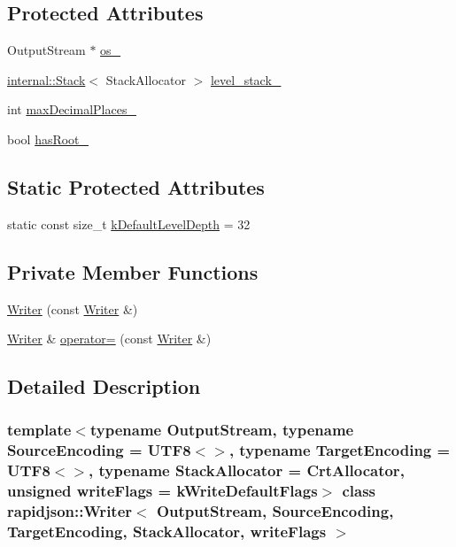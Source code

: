 \subsection*{Protected Attributes}
\begin{DoxyCompactItemize}
\item 
Output\+Stream $\ast$ \mbox{\hyperlink{classrapidjson_1_1_writer_a1370d3fd6728d4f0b3f20d734bb27eaf}{os\+\_\+}}
\item 
\mbox{\hyperlink{classrapidjson_1_1internal_1_1_stack}{internal\+::\+Stack}}$<$ Stack\+Allocator $>$ \mbox{\hyperlink{classrapidjson_1_1_writer_a939007778b53074132750d9eccfdc5a2}{level\+\_\+stack\+\_\+}}
\item 
int \mbox{\hyperlink{classrapidjson_1_1_writer_a4666542e7957218d23c2a1b68c7295d8}{max\+Decimal\+Places\+\_\+}}
\item 
bool \mbox{\hyperlink{classrapidjson_1_1_writer_ac374605d753f26912b8462fc478e4b3e}{has\+Root\+\_\+}}
\end{DoxyCompactItemize}
\subsection*{Static Protected Attributes}
\begin{DoxyCompactItemize}
\item 
static const size\+\_\+t \mbox{\hyperlink{classrapidjson_1_1_writer_a9acc453af3bfddea0bf001e022ae411c}{k\+Default\+Level\+Depth}} = 32
\end{DoxyCompactItemize}
\subsection*{Private Member Functions}
\begin{DoxyCompactItemize}
\item 
\mbox{\hyperlink{classrapidjson_1_1_writer_a68186577190a60019951574cb99d6559}{Writer}} (const \mbox{\hyperlink{classrapidjson_1_1_writer}{Writer}} \&)
\item 
\mbox{\hyperlink{classrapidjson_1_1_writer}{Writer}} \& \mbox{\hyperlink{classrapidjson_1_1_writer_a7ca46f860c7c80c9499706b4f79288d8}{operator=}} (const \mbox{\hyperlink{classrapidjson_1_1_writer}{Writer}} \&)
\end{DoxyCompactItemize}


\subsection{Detailed Description}
\subsubsection*{template$<$typename Output\+Stream, typename Source\+Encoding = U\+T\+F8$<$$>$, typename Target\+Encoding = U\+T\+F8$<$$>$, typename Stack\+Allocator = Crt\+Allocator, unsigned write\+Flags = k\+Write\+Default\+Flags$>$\newline
class rapidjson\+::\+Writer$<$ Output\+Stream, Source\+Encoding, Target\+Encoding, Stack\+Allocator, write\+Flags $>$}

